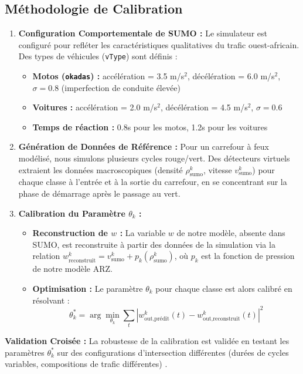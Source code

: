 \subsection{Méthodologie de Calibration}
\begin{enumerate}
    \item \textbf{Configuration Comportementale de SUMO :} Le simulateur est configuré pour refléter les caractéristiques qualitatives du trafic ouest-africain. Des types de véhicules (\texttt{vType}) sont définis :
    \begin{itemize}
        \item \textbf{Motos (\texttt{okadas}) :} accélération = 3.5 m/s\(^2\), décélération = 6.0 m/s\(^2\), \( \sigma = 0.8 \) (imperfection de conduite élevée)
        \item \textbf{Voitures :} accélération = 2.0 m/s\(^2\), décélération = 4.5 m/s\(^2\), \( \sigma = 0.6 \)
        \item \textbf{Temps de réaction :} 0.8s pour les motos, 1.2s pour les voitures
    \end{itemize}
    \item \textbf{Génération de Données de Référence :} Pour un carrefour à feux modélisé, nous simulons plusieurs cycles rouge/vert. Des détecteurs virtuels extraient les données macroscopiques (densité \( \rho_{\text{sumo}}^k \), vitesse \( v_{\text{sumo}}^k \)) pour chaque classe à l'entrée et à la sortie du carrefour, en se concentrant sur la phase de démarrage après le passage au vert.
    \item \textbf{Calibration du Paramètre \( \theta_k \) :}
    \begin{itemize}
        \item \textbf{Reconstruction de \( w \) :} La variable \( w \) de notre modèle, absente dans SUMO, est reconstruite à partir des données de la simulation via la relation \( w_{\text{reconstruit}}^k = v_{\text{sumo}}^k + p_k(\rho_{\text{sumo}}^k) \), où \( p_k \) est la fonction de pression de notre modèle ARZ.
        \item \textbf{Optimisation :} Le paramètre \( \theta_k \) pour chaque classe est alors calibré en résolvant :
        \[
        \theta_k^* = \arg\min_{\theta_k} \sum_{t} \left| w_{\text{out,prédit}}^k(t) - w_{\text{out,reconstruit}}^k(t) \right|^2
        \]
    \end{itemize}
\end{enumerate}

\textbf{Validation Croisée :} La robustesse de la calibration est validée en testant les paramètres \( \theta_k^* \) sur des configurations d'intersection différentes (durées de cycles variables, compositions de trafic différentes) \cite{BouadiOuwerkerk2022}.

